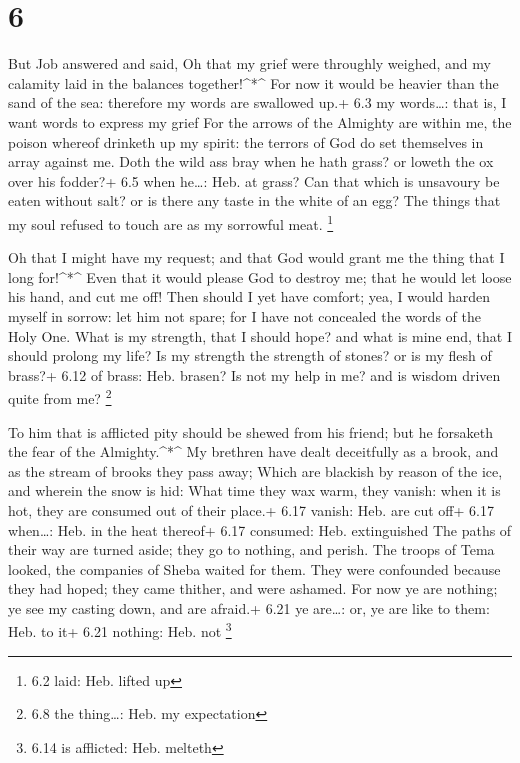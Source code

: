 \hypertarget{section-5}{%
\section{6}\label{section-5}}

 But Job answered and said,  Oh that my grief
were throughly weighed, and my calamity laid in the balances
together!\^{}*\^{}  For now it would be heavier than the
sand of the sea: therefore my words are swallowed up.+ 6.3 my
words\ldots: that is, I want words to express my grief  For
the arrows of the Almighty are within me, the poison whereof drinketh up
my spirit: the terrors of God do set themselves in array against me.
 Doth the wild ass bray when he hath grass? or loweth the ox
over his fodder?+ 6.5 when he\ldots: Heb. at grass?  Can
that which is unsavoury be eaten without salt? or is there any taste in
the white of an egg?  The things that my soul refused to
touch are as my sorrowful meat. \footnote{6.2 laid: Heb. lifted up}

 Oh that I might have my request; and that God would grant
me the thing that I long for!\^{}*\^{}  Even that it would
please God to destroy me; that he would let loose his hand, and cut me
off!  Then should I yet have comfort; yea, I would harden
myself in sorrow: let him not spare; for I have not concealed the words
of the Holy One.  What is my strength, that I should hope?
and what is mine end, that I should prolong my life?  Is my
strength the strength of stones? or is my flesh of brass?+ 6.12 of
brass: Heb. brasen?  Is not my help in me? and is wisdom
driven quite from me? \footnote{6.8 the thing\ldots: Heb. my expectation}

 To him that is afflicted pity should be shewed from his
friend; but he forsaketh the fear of the Almighty.\^{}*\^{}
 My brethren have dealt deceitfully as a brook, and as the
stream of brooks they pass away;  Which are blackish by
reason of the ice, and wherein the snow is hid:  What time
they wax warm, they vanish: when it is hot, they are consumed out of
their place.+ 6.17 vanish: Heb. are cut off+ 6.17 when\ldots: Heb. in
the heat thereof+ 6.17 consumed: Heb. extinguished  The
paths of their way are turned aside; they go to nothing, and perish.
 The troops of Tema looked, the companies of Sheba waited
for them.  They were confounded because they had hoped;
they came thither, and were ashamed.  For now ye are
nothing; ye see my casting down, and are afraid.+ 6.21 ye are\ldots: or,
ye are like to them: Heb. to it+ 6.21 nothing: Heb. not \footnote{6.14
  is afflicted: Heb. melteth}


